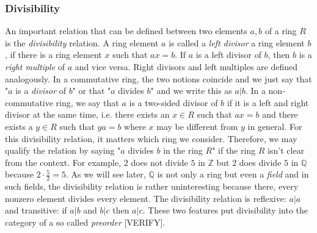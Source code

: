 
\subsubsection{Divisibility}
An important relation that can be defined between two elements $a,b$ of a ring $R$ is the \emph{divisibility} relation. A ring element $a$ is called a \emph{left divisor} a ring element $b$, if there is a ring element $x$ such that $a x = b$. If $a$ is a left divisor of $b$, then $b$ is a \emph{right multiple} of $a$ and vice versa. Right divisors and left multiples are defined analogously. In a commutative ring, the two notions coincide and we just say that "$a$ is a \emph{divisor} of $b$" or that "$a$ divides $b$" and we write this as $a|b$. In a non-commutative ring, we say that $a$ is a two-sided divisor of $b$ if it is a left and right divisor at the same time, i.e. there exists an $x \in R$ such that $a x = b$ and there exists a $y \in R$ such that $y a = b$ where $x$ may be different from $y$ in general. For this divisibility relation, it matters which ring we consider. Therefore, we may qualify the relation by saying "$a$ divides $b$ in the ring $R$" if the ring $R$ isn't clear from the context. For example, $2$ does not divide $5$ in $\mathbb{Z}$ but $2$ does divide $5$ in $\mathbb{Q}$ because $2 \cdot \frac{5}{2} = 5$. As we will see later, $\mathbb{Q}$ is not only a ring but even a \emph{field} and in such fields, the divisibility relation is rather uninteresting because there, every nonzero element divides every element. The divisibility relation is reflexive: $a|a$ and transitive: if $a|b$ and $b|c$ then $a|c$. These two features put divisibility into the category of a so called \emph{preorder} [VERIFY]. 





